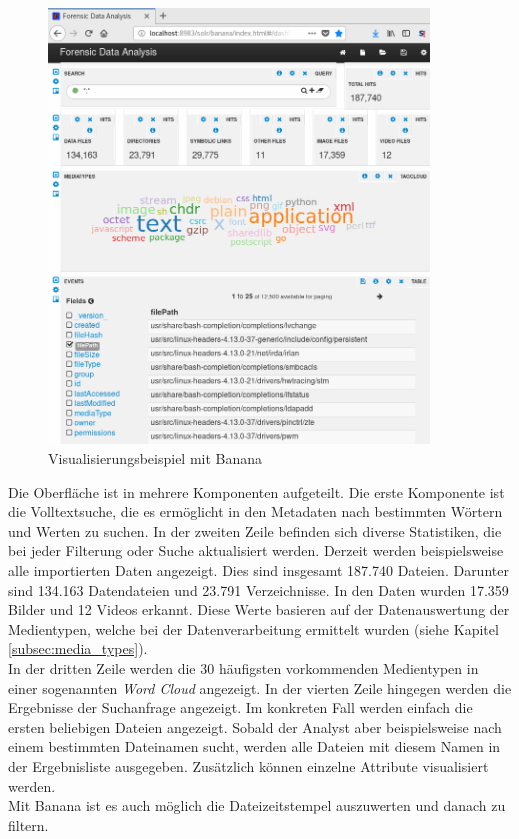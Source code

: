 \begin{figure}[ht]
  \centering
  \includegraphics[width=0.9\textwidth]{./resource/forensicDataAnalysisUI.png}
  \caption{Visualisierungsbeispiel mit Banana}
  \label{fig:banana_visualization}
\end{figure}

\noindent
Die Oberfläche ist in mehrere Komponenten aufgeteilt. Die erste Komponente ist die Volltextsuche, die es ermöglicht in den Metadaten nach bestimmten Wörtern und Werten zu suchen. In der zweiten Zeile befinden sich diverse Statistiken, die bei jeder Filterung oder Suche aktualisiert werden. 
Derzeit werden beispielsweise alle importierten Daten angezeigt. Dies sind insgesamt 187.740 Dateien. Darunter sind 134.163 Datendateien und 23.791 Verzeichnisse. In den Daten wurden 17.359 Bilder und 12 Videos erkannt. Diese Werte basieren auf der Datenauswertung der Medientypen, welche bei der Datenverarbeitung ermittelt wurden (siehe Kapitel \ref{subsec:media_types}).\\
In der dritten Zeile werden die 30 häufigsten vorkommenden Medientypen in einer sogenannten \textit{Word Cloud} angezeigt. In der vierten Zeile hingegen werden die Ergebnisse der Suchanfrage angezeigt. Im konkreten Fall werden einfach die ersten beliebigen Dateien angezeigt. 
Sobald der Analyst aber beispielsweise nach einem bestimmten Dateinamen sucht, werden alle Dateien mit diesem Namen in der Ergebnisliste ausgegeben. Zusätzlich können einzelne Attribute visualisiert werden.\\
Mit Banana ist es auch möglich die Dateizeitstempel auszuwerten und danach zu filtern.\\

